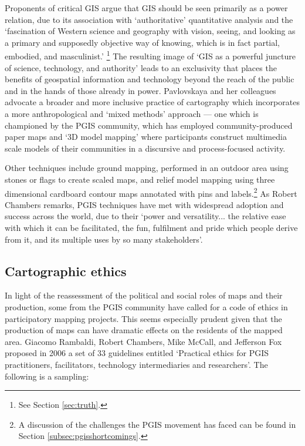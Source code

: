 \documentclass[11pt,oneside,notitlepage]{report}
\begin{document}
{{Proponents of critical GIS argue that \ac{GIS} should be seen primarily as a power relation, due to its association with `authoritative' quantitative analysis and the `fascination of Western science and geography with vision, seeing, and looking as a primary and supposedly objective way of knowing, which is in fact partial, embodied, and masculinist.' \cite{pavlovskaya2009nonquantitative}\footnote{See Section \ref{sec:truth}.} The resulting image of `GIS as a powerful juncture of science, technology, and authority' \cite{pavlovskaya2009nonquantitative} leads to an exclusivity that places the benefits of geospatial information and technology beyond the reach of the public and in the hands of those already in power. Pavlovskaya and her colleagues advocate a broader and more inclusive practice of cartography which incorporates a more anthropological and `mixed methods' approach --- one which is championed by the \ac{PGIS} community, which has employed community-produced paper maps and `3D model mapping' where participants construct multimedia scale models of their communities in a discursive and process-focused activity. 

Other techniques include ground mapping, performed in an outdoor area using stones or flags to create scaled maps, and relief model mapping using three dimensional cardboard contour maps annotated with pins and labels.\footnote{A discussion of the challenges the \ac{PGIS} movement has faced can be found in Section \ref{subsec:pgisshortcomings}.} As Robert Chambers remarks, \ac{PGIS} techniques have met with widespread adoption and success across the world, due to their `power and versatility... the relative ease with which it can be facilitated, the fun, fulfilment and pride which people derive from it, and its multiple uses by so many stakeholders'. \cite{chambers2006whose}

\subsection{Cartographic ethics}
\label{sec:ethics}

In light of the reassessment of the political and social roles of maps and their production, some from the \ac{PGIS} community have called for a code of ethics in participatory mapping projects. This seems especially prudent given that the production of maps can have dramatic effects on the residents of the mapped area. Giacomo Rambaldi, Robert Chambers, Mike McCall, and Jefferson Fox proposed in 2006 a set of 33 guidelines entitled `Practical ethics for \ac{PGIS} practitioners, facilitators, technology intermediaries and researchers'. The following is a sampling:

}}
\end{document}
